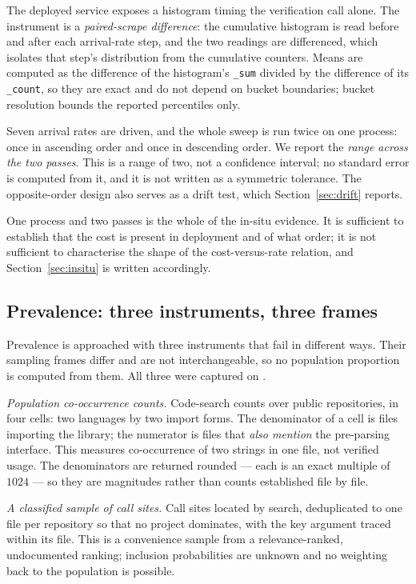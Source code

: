 \documentclass[pdflatex,sn-basic,twocolumn]{sn-jnl}%
\begin{document}
The deployed service exposes a histogram timing the verification call alone. The
instrument is a \emph{paired-scrape difference}: the cumulative histogram is read
before and after each arrival-rate step, and the two readings are differenced,
which isolates that step's distribution from the cumulative counters. Means are
computed as the difference of the histogram's \texttt{\_sum} divided by the
difference of its \texttt{\_count}, so they are exact and do not depend on bucket
boundaries; bucket resolution bounds the reported percentiles only.

Seven arrival rates are driven, and the whole sweep is run twice on one process:
once in ascending order and once in descending order. We report the \emph{range
across the two passes}. This is a range of two, not a confidence interval; no
standard error is computed from it, and it is not written as a symmetric
tolerance. The opposite-order design also serves as a drift test, which
Section~\ref{sec:drift} reports.

One process and two passes is the whole of the in-situ evidence. It is sufficient
to establish that the cost is present in deployment and of what order; it is not
sufficient to characterise the shape of the cost-versus-rate relation, and
Section~\ref{sec:insitu} is written accordingly.

\subsection{Prevalence: three instruments, three frames}\label{sec:frames}

Prevalence is approached with three instruments that fail in different ways.
Their sampling frames differ and are not interchangeable, so no population
proportion is computed from them. All three were captured on \PopCapturedAt.

\emph{Population co-occurrence counts.} Code-search counts over public
repositories, in four cells: two languages by two import forms. The denominator
of a cell is files importing the library; the numerator is files that \emph{also
mention} the pre-parsing interface. This measures co-occurrence of two strings in
one file, not verified usage. The denominators are returned rounded --- each is
an exact multiple of $1024$ --- so they are magnitudes rather than counts
established file by file.

\emph{A classified sample of call sites.} Call sites located by search,
deduplicated to one file per repository so that no project dominates, with the
key argument traced within its file. This is a convenience sample from a
relevance-ranked, undocumented ranking; inclusion probabilities are unknown and
no weighting back to the population is possible.
\end{document}
